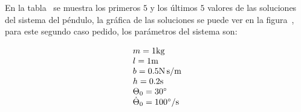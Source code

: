 
En la tabla~ se muestra los primeros $5$ y los últimos $5$ valores de las soluciones del sistema del péndulo, la gráfica de las soluciones se puede ver en la figura~, para este segundo caso pedido, los parámetros del sistema son:

\begin{equation*}
                \begin{array}{ll}
                  m = 1 \si[per-mode=symbol]{\kilo\gram} \\
                  l = 1 \si[per-mode=symbol]{\meter} \\  
                  b = 0.5 \si[per-mode=symbol]{\newton\second\per\meter} \\ 
                  h = 0.2 \si[per-mode=symbol]{\second} \\   
                  \Theta_{0} = 30 \si[per-mode=symbol]{\degree} \\  
                  \dot{\Theta}_{0} = 100 \si[per-mode=symbol]{\degree\per\second} \\            
                \end{array}
\end{equation*}







